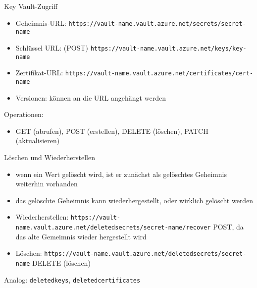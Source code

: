 \begin{flashcard}[Definition]{Key Vault-Zugriff}
    \begin{itemize}
        \item Geheimnis-URL:\newline
            \texttt{https://vault-name.vault.azure.net/secrets/secret-name}\newline
        \item Schlüssel URL: (POST)\newline
            \texttt{https://vault-name.vault.azure.net/keys/key-name}\newline
        \item Zertifikat-URL:\newline
            \texttt{https://vault-name.vault.azure.net/certificates/cert-name}\newline
        \item Versionen: können an die URL angehängt werden
    \end{itemize}
    Operationen:
    \begin{itemize}
        \item GET (abrufen), POST (erstellen), DELETE (löschen), PATCH (aktualisieren)
    \end{itemize}
\end{flashcard}


\begin{flashcard}[Definition]{Löschen und Wiederherstellen}
    \begin{itemize}
        \item wenn ein Wert gelöscht wird, ist er zunächst als gelöschtes Geheimnis weiterhin vorhanden
        \item das gelöschte Geheimnis kann wiederhergestellt, oder wirklich gelöscht werden
        \item Wiederherstellen:\newline
            \texttt{https://vault-name.vault.azure.net/deletedsecrets/secret-name/recover}\newline
            POST, da das alte Gemeimnis wieder hergestellt wird
        \item Löschen:\newline
            \texttt{https://vault-name.vault.azure.net/deletedsecrets/secret-name}\newline
            DELETE (löschen)
    \end{itemize}
    Analog: \texttt{deletedkeys}, \texttt{deletedcertificates}
\end{flashcard}
